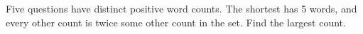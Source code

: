 Five questions have distinct positive word counts. The shortest has 5 words, and every other count is twice some other count in the set. Find the largest count.
